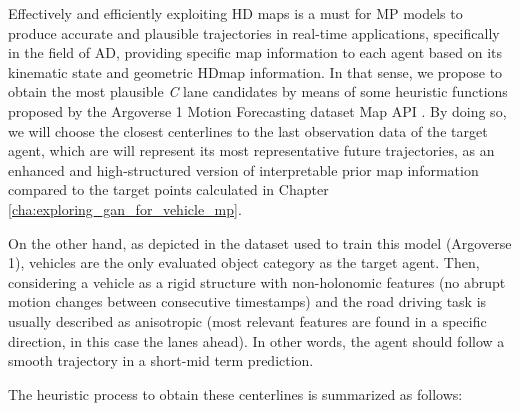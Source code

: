Effectively and efficiently exploiting HD maps is a must for \ac{MP} models to produce accurate and plausible trajectories in real-time applications, specifically in the field of \ac{AD}, providing specific map information to each agent based on its kinematic state and geometric \ac{HDmap} information. In that sense, we propose to obtain the most plausible \textit{C} lane candidates by means of some heuristic functions proposed by the Argoverse 1 Motion Forecasting dataset Map API \cite{chang2019argoverse, khandelwal2020if}. By doing so, we will choose the closest centerlines to the last observation data of the target agent, which are will represent its most representative future trajectories, as an enhanced and high-structured version of interpretable prior map information compared to the target points calculated in Chapter \ref{cha:exploring_gan_for_vehicle_mp}.

On the other hand, as depicted in the dataset used to train this model (Argoverse 1), vehicles are the only evaluated object category as the target agent. Then, considering a vehicle as a rigid structure with non-holonomic \cite{triggs1993motion} features (no abrupt motion changes between consecutive timestamps) and the road driving task is usually described as anisotropic \cite{ross1989planning} (most relevant features are found in a specific direction, in this case the lanes ahead). In other words, the agent should follow a smooth trajectory in a short-mid term prediction. 

The heuristic process to obtain these centerlines is summarized as follows:


